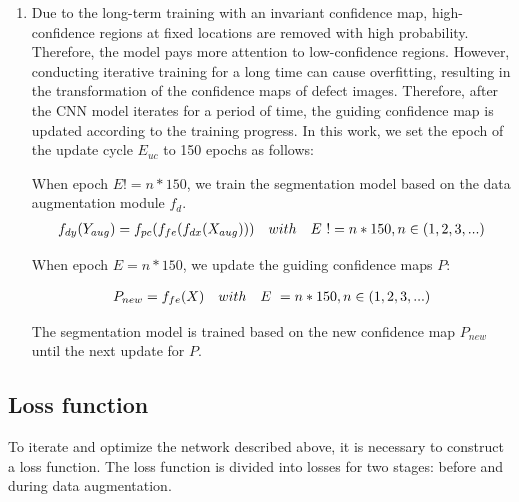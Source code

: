 \documentclass[sn-mathphys]{sn-jnl}%
\theoremstyle{thmstyleone}%
\theoremstyle{thmstyletwo}%
\theoremstyle{thmstylethree}%
\begin{document}
\begin{enumerate}[1)]
\item Due to the long-term training with an invariant confidence map, high-confidence regions at fixed locations are removed with high probability. Therefore, the model pays more attention to low-confidence regions. However, conducting iterative training for a long time can cause overfitting, resulting in the transformation of the confidence maps of defect images. Therefore, after the CNN model iterates for a period of time, the guiding confidence map is updated according to the training progress. In this work, we set the epoch of the update cycle $E_{uc}$ to 150 epochs as follows: 

When epoch $E != n*150$, we train the segmentation model based on the data augmentation module $f_{d}$.
\begin{equation}
\centering
\begin{split}
f_{dy}(Y_{aug}) = f_{pc}(f_{fe}(f_{dx}(X_{aug})))~~~with~~~E~!= n*150, n \in (1,2,3,...)
\end{split}
\end{equation}

When epoch $E = n*150$, we update the guiding confidence maps $P$:

\begin{equation}
\centering
\begin{split}
P_{new} = f_{fe}(X)~~~with~~~E~= n*150, n \in (1,2,3,...)
\end{split}
\end{equation}

The segmentation model is trained based on the new confidence map $P_{new}$ until the next update for $P$.

\end{enumerate}

\subsection{Loss function}\label{sec:loss}
To iterate and optimize the network described above, it is necessary to construct a loss function. The loss function is divided into losses for two stages: before and during data augmentation.
\end{document}
